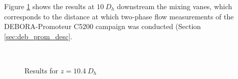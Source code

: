 Figure \ref{fig:agate_cfd_10dh} shows the results at $10\ D_{h}$ downstream the mixing vanes, which corresponds to the distance at which two-phase flow measurements of the DEBORA-Promoteur C5200 campaign was conducted (Section \ref{sec:deb_prom_desc}.

\begin{figure}[!h]
\centering
{}
\\
\caption{Results for $z=10.4\ D_{h}$}
\label{fig:agate_cfd_10dh}
\end{figure}

